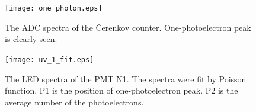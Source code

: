 \documentclass[11pt,titlepage]{article}
\begin{document}

 \begin{figure}
 \hspace{0.5cm}
 \begin{centering}
  \texttt{[image: one\_photon.eps]}
 \vspace{0.5cm}
 \caption{\label{one_photon}
The ADC spectra of the \v Cerenkov counter. One-photoelectron peak is clearly seen. }
\end{centering}
 \end{figure}


%
%

 \begin{figure}
 \hspace{0.5cm}
 \begin{centering}
  \texttt{[image: uv\_1\_fit.eps]}
 \vspace{0.5cm}
 \caption{\label{uv_1_fit}
The LED spectra of the PMT N1. The spectra were fit by Poisson function.
P1 is the position of one-photoelectron peak. P2 is the average number of the photoelectrons.}
\end{centering}
 \end{figure}
\end{document}
